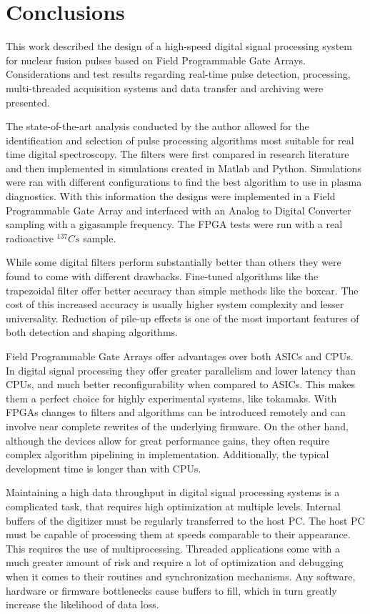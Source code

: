 \section{Conclusions}

This work described the design of 
a high-speed digital signal processing system for nuclear fusion pulses
based on Field Programmable Gate Arrays.
Considerations and test results regarding real-time pulse detection, processing, 
multi-threaded acquisition systems and data transfer and archiving were presented.


The state-of-the-art analysis conducted by the author allowed for the identification
and selection of pulse processing algorithms most suitable for real time digital spectroscopy.
The filters were first compared in research literature
and then implemented in simulations created in Matlab and Python.
Simulations were ran with different 
configurations to find the best algorithm to use in plasma diagnostics. With this
information the designs were implemented in a Field Programmable Gate Array
and interfaced with an Analog to Digital Converter sampling with a gigasample frequency.
The FPGA tests were run with a real radioactive $^{137} Cs$ sample.


While some digital filters perform substantially better than others
they were found to come with different drawbacks. 
Fine-tuned algorithms like the trapezoidal filter
offer better accuracy than simple methods like the boxcar. The cost of this
increased accuracy is usually higher system complexity and lesser universality. 
Reduction of pile-up effects is one of the most important features of 
both detection and shaping algorithms.


Field Programmable Gate Arrays offer advantages over both 
ASICs and CPUs. In digital signal processing they offer greater parallelism and lower latency
than CPUs, and much better reconfigurability when compared to ASICs. 
This makes them a perfect choice for highly experimental systems, like tokamaks.
With FPGAs changes to filters and algorithms can be introduced remotely and
can involve near complete rewrites of the underlying firmware.
On the other hand, although the devices allow for great performance gains, 
they often require complex algorithm pipelining in implementation. 
Additionally, the typical development time is longer than with CPUs.


Maintaining a high data throughput in digital signal processing systems
is a complicated task, that requires high optimization at multiple levels.
Internal buffers of the digitizer must be regularly transferred to the host PC.
The host PC must be capable of processing them at speeds comparable to their appearance.
This requires the use of multiprocessing.
Threaded applications come with a much greater amount of risk
and require a lot of optimization and debugging
when it comes to their routines and synchronization mechanisms.
Any software, hardware or firmware bottlenecks cause buffers to fill, 
which in turn greatly increase the likelihood of data loss.

